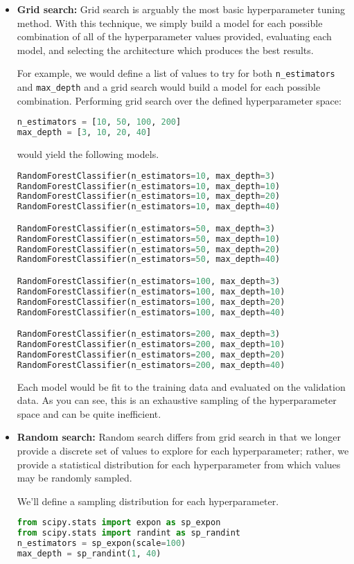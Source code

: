 \documentclass{book}
\begin{document}
\begin{itemize}
\item \textbf{Grid search:} Grid search is arguably the most basic hyperparameter tuning method. With this technique, we simply build a model for each possible combination of all of the hyperparameter values provided, evaluating each model, and selecting the architecture which produces the best results.

For example, we would define a list of values to try for both \texttt{n\_estimators} and \texttt{max\_depth} and a grid search would build a model for each possible combination.
Performing grid search over the defined hyperparameter space:
\begin{lstlisting}[language=Python]
n_estimators = [10, 50, 100, 200]
max_depth = [3, 10, 20, 40]
\end{lstlisting}
would yield the following models.
\begin{lstlisting}[language=Python]
RandomForestClassifier(n_estimators=10, max_depth=3)
RandomForestClassifier(n_estimators=10, max_depth=10)
RandomForestClassifier(n_estimators=10, max_depth=20)
RandomForestClassifier(n_estimators=10, max_depth=40)

RandomForestClassifier(n_estimators=50, max_depth=3)
RandomForestClassifier(n_estimators=50, max_depth=10)
RandomForestClassifier(n_estimators=50, max_depth=20)
RandomForestClassifier(n_estimators=50, max_depth=40)

RandomForestClassifier(n_estimators=100, max_depth=3)
RandomForestClassifier(n_estimators=100, max_depth=10)
RandomForestClassifier(n_estimators=100, max_depth=20)
RandomForestClassifier(n_estimators=100, max_depth=40)

RandomForestClassifier(n_estimators=200, max_depth=3)
RandomForestClassifier(n_estimators=200, max_depth=10)
RandomForestClassifier(n_estimators=200, max_depth=20)
RandomForestClassifier(n_estimators=200, max_depth=40)
\end{lstlisting}
Each model would be fit to the training data and evaluated on the validation data. As you can see, this is an exhaustive sampling of the hyperparameter space and can be quite inefficient.
\item \textbf{Random search:} Random search differs from grid search in that we longer provide a discrete set of values to explore for each hyperparameter; rather, we provide a statistical distribution for each hyperparameter from which values may be randomly sampled.

We'll define a sampling distribution for each hyperparameter.
\begin{lstlisting}[language=Python]
from scipy.stats import expon as sp_expon
from scipy.stats import randint as sp_randint
n_estimators = sp_expon(scale=100)
max_depth = sp_randint(1, 40)
\end{lstlisting}


\end{itemize}
\end{document}
